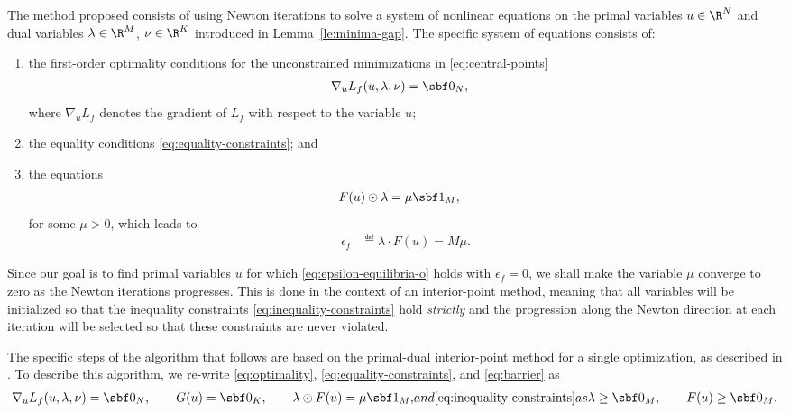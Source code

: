\documentclass[11pt]{article}
\begin{document}
The method proposed consists of using Newton iterations to solve a
system of nonlinear equations on the primal variables $u\in\R^{N}$
and dual variables $\lambda\in\R^{M}$, $\nu\in\R^{K}$ introduced in
Lemma~\ref{le:minima-gap}. The specific system of equations
consists of:
\begin{enumerate}
\item the first-order optimality conditions for the unconstrained
  minimizations in \eqref{eq:central-points}
  \begin{align}\label{eq:optimality}
    \nabla_u L_f(u,\lambda,\nu)&=\sbf 0_{N}, &
  \end{align}
  where $\nabla_u L_f$ denotes the gradient of $L_f$ with respect to the
  variable $u$;
\item the equality conditions \eqref{eq:equality-constraints}; and
\item the equations
  \begin{align}\label{eq:barrier}
    F(u)\odot\lambda&=\mu\sbf 1_{M},
  \end{align}
  for some $\mu>0$, which leads to
  \begin{align*}
    \epsilon_f&\eqdef \lambda\cdot F(u)=M \mu.
  \end{align*}
\end{enumerate}
Since our goal is to find primal variables $u$ for which
\eqref{eq:epsilon-equilibria-o} holds with $\epsilon_f=0$, we shall make the
variable $\mu$ converge to zero as the Newton iterations
progresses. This is done in the context of an interior-point method,
meaning that all variables will be initialized so that the inequality
constraints \eqref{eq:inequality-constraints} hold \emph{strictly} and
the progression along the Newton direction at each iteration will be
selected so that these constraints are never violated.

\medskip

The specific steps of the algorithm that follows are based on the
primal-dual interior-point method for a single optimization, as
described in \cite{Vandenberghe2010}. To describe this algorithm, we
re-write \eqref{eq:optimality}, \eqref{eq:equality-constraints}, and
\eqref{eq:barrier} as
\begin{subequations}\label{eq:primal-dual}
  \begin{gather}
    \label{eq:primal-dual-equalities}
    \nabla_u L_f(u,\lambda,\nu)=\sbf 0_{N}, \qquad
    G(u)=\sbf 0 _{K}, \qquad
    \lambda\odot F(u)=\mu\sbf 1_{M}, 
  \end{gather}
and \eqref{eq:inequality-constraints} as
\begin{gather}
  \label{eq:primal-dual-inequalities}
  \lambda\ge \sbf 0_{M}, \qquad F(u)\ge \sbf 0_{M}.
\end{gather}
\end{subequations}
\end{document}
